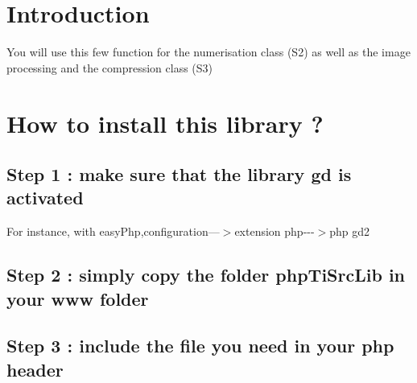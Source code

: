 \hypertarget{index_Introduction}{}\section{\-Introduction}\label{index_Introduction}
\-You will use this few function for the numerisation class (\-S2) as well as the image processing and the compression class (\-S3)\hypertarget{index_install}{}\section{\-How to install this library ?}\label{index_install}
\hypertarget{index_install_gd}{}\subsection{\-Step 1 \-: make sure that the library gd is activated}\label{index_install_gd}
\-For instance, with easy\-Php,configuration—$>$extension php-\/-\/-\/$>$php gd2\hypertarget{index_install_step1}{}\subsection{\-Step 2 \-: simply copy the folder php\-Ti\-Src\-Lib in your www folder}\label{index_install_step1}
\hypertarget{index_install_step3}{}\subsection{\-Step 3 \-: include the file you need in your php header}\label{index_install_step3}


